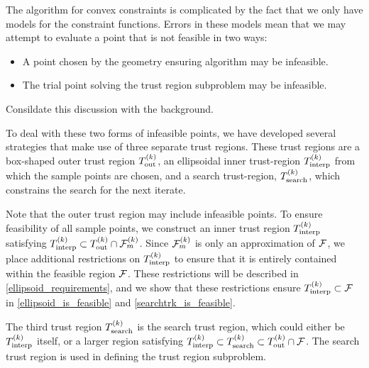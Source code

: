 
\label{infeasible_point_strategies}


The algorithm for convex constraints is complicated by the fact that we only have models for the constraint functions.
Errors in these models mean that we may attempt to evaluate a point that is not feasible in two ways:
\begin{itemize}
\item A point chosen by the geometry ensuring algorithm may be infeasible.
\item The trial point solving the trust region subproblem may be infeasible.
\end{itemize}



\begin{boxedcomment}
Consildate this discussion with the background.
\end{boxedcomment}

To deal with these two forms of infeasible points, we have developed several strategies that make use of three separate trust regions.
These trust regions are a box-shaped outer trust region ${T_{\text{out}}^{(k)}}$,  an ellipsoidal inner trust-region ${T_{\text{interp}}^{(k)}}$ from which the sample points are chosen, 
and a search trust-region, ${T_{\text{search}}^{(k)}}$, which constrains the search for the next iterate.

Note that the outer trust region may include infeasible points.
To ensure feasibility of all sample points, we construct an inner trust region  $ {T_{\text{interp}}^{(k)}} $  satisfying 
${T_{\text{interp}}^{(k)}} \subset {T_{\text{out}}^{(k)}} \cap {\mathcal F_m^{(k)}}$.
Since ${\mathcal F_m^{(k)}}$ is only an approximation of ${\mathcal F}$,  we place additional restrictions on ${T_{\text{interp}}^{(k)}}$
to ensure that it is entirely contained within the feasible region ${\mathcal F}$.
These restrictions will be described in \cref{ellipsoid_requirements}, 
and we show that these restrictions ensure ${T_{\text{interp}}^{(k)}} \subset {\mathcal F}$ in \cref{ellipsoid_is_feasible} and \cref{searchtrk_is_feasible}.


The third trust region ${T_{\text{search}}^{(k)}}$ is the search trust region, which could either be ${T_{\text{interp}}^{(k)}}$ itself, 
or a larger region satisfying $ {T_{\text{interp}}^{(k)}} \subset {T_{\text{search}}^{(k)}} \subset {T_{\text{out}}^{(k)}} \cap {\mathcal F}$.
The search trust region is used in defining the trust region subproblem.

